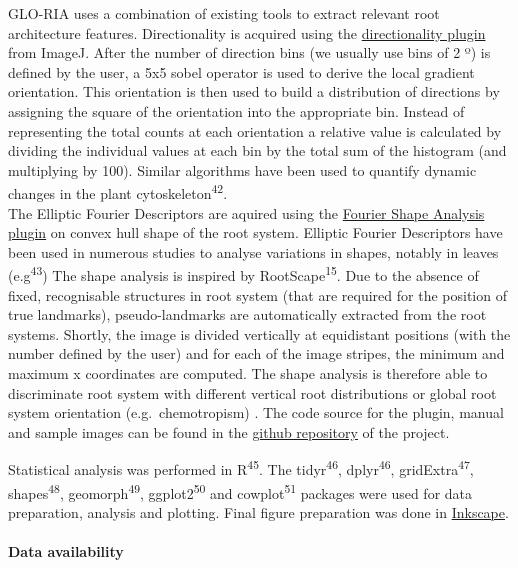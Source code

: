 \documentclass[]{article}
\begin{document}
GLO-RIA uses a combination of existing tools to extract relevant root
architecture features. Directionality is acquired using the
\href{http://fiji.sc/Directionality}{directionality plugin} from ImageJ.
After the number of direction bins (we usually use bins of 2 º) is
defined by the user, a 5x5 sobel operator is used to derive the local
gradient orientation. This orientation is then used to build a
distribution of directions by assigning the square of the orientation
into the appropriate bin. Instead of representing the total counts at
each orientation a relative value is calculated by dividing the
individual values at each bin by the total sum of the histogram (and
multiplying by 100). Similar algorithms have been used to quantify
dynamic changes in the plant cytoskeleton\textsuperscript{42}.\\The
Elliptic Fourier Descriptors are aquired using the
\href{http://imagejdocu.tudor.lu/doku.php?id=plugin:analysis:fourier_shape_analysis:start}{Fourier
Shape Analysis plugin} on convex hull shape of the root system. Elliptic
Fourier Descriptors have been used in numerous studies to analyse
variations in shapes, notably in leaves (e.g\textsuperscript{43}) The
shape analysis is inspired by RootScape\textsuperscript{15}. Due to the
absence of fixed, recognisable structures in root system (that are
required for the position of true landmarks), pseudo-landmarks are
automatically extracted from the root systems. Shortly, the image is
divided vertically at equidistant positions (with the number defined by
the user) and for each of the image stripes, the minimum and maximum x
coordinates are computed. The shape analysis is therefore able to
discriminate root system with different vertical root distributions or
global root system orientation (e.g.~chemotropism) . The code source for
the plugin, manual and sample images can be found in the
\href{https://github.com/rr-lab/GLO-Roots/tree/master/gloria}{github
repository} of the project.

Statistical analysis was performed in R\textsuperscript{45}. The
tidyr\textsuperscript{46}, dplyr\textsuperscript{46},
gridExtra\textsuperscript{47}, shapes\textsuperscript{48},
geomorph\textsuperscript{49}, ggplot2\textsuperscript{50} and
cowplot\textsuperscript{51} packages were used for data preparation,
analysis and plotting. Final figure preparation was done in
\href{https://inkscape.org/en/}{Inkscape}.

\paragraph{Data availability}\label{data-availability}
\end{document}
